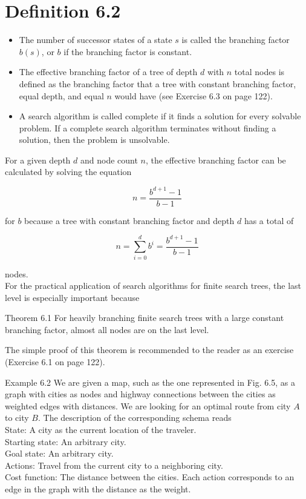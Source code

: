 \documentclass[10pt]{article}
\begin{document}
\section*{Definition 6.2}
\begin{itemize}
  \item The number of successor states of a state $s$ is called the branching factor $b(s)$, or $b$ if the branching factor is constant.
  \item The effective branching factor of a tree of depth $d$ with $n$ total nodes is defined as the branching factor that a tree with constant branching factor, equal depth, and equal $n$ would have (see Exercise 6.3 on page 122).
  \item A search algorithm is called complete if it finds a solution for every solvable problem. If a complete search algorithm terminates without finding a solution, then the problem is unsolvable.
\end{itemize}

For a given depth $d$ and node count $n$, the effective branching factor can be calculated by solving the equation


\begin{equation*}
n=\frac{b^{d+1}-1}{b-1} \tag{6.1}
\end{equation*}


for $b$ because a tree with constant branching factor and depth $d$ has a total of


\begin{equation*}
n=\sum_{i=0}^{d} b^{i}=\frac{b^{d+1}-1}{b-1} \tag{6.2}
\end{equation*}


nodes.\\
For the practical application of search algorithms for finite search trees, the last level is especially important because

Theorem 6.1 For heavily branching finite search trees with a large constant branching factor, almost all nodes are on the last level.

The simple proof of this theorem is recommended to the reader as an exercise (Exercise 6.1 on page 122).

Example 6.2 We are given a map, such as the one represented in Fig. 6.5, as a graph with cities as nodes and highway connections between the cities as weighted edges with distances. We are looking for an optimal route from city $A$ to city $B$. The description of the corresponding schema reads\\
State: A city as the current location of the traveler.\\
Starting state: An arbitrary city.\\
Goal state: An arbitrary city.\\
Actions: Travel from the current city to a neighboring city.\\
Cost function: The distance between the cities. Each action corresponds to an edge in the graph with the distance as the weight.
\end{document}
